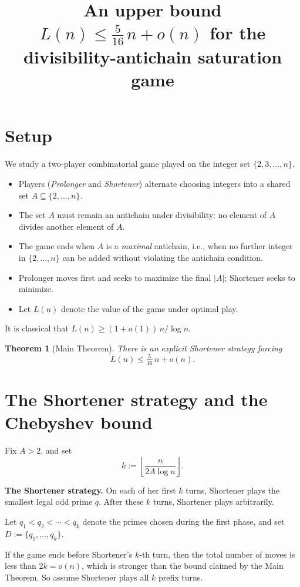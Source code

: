 \documentclass{article}
\title{An upper bound $L(n) \le \tfrac{5}{16}\,n + o(n)$ for the divisibility-antichain saturation game}
\newtheorem{theorem}{Theorem}
\begin{document}
\maketitle

\section{Setup}

We study a two-player combinatorial game played on the integer set $\{2, 3, \ldots, n\}$.

\begin{itemize}
  \item Players (\emph{Prolonger} and \emph{Shortener}) alternate choosing integers into a shared set $A \subseteq \{2, \ldots, n\}$.
  \item The set $A$ must remain an antichain under divisibility: no element of $A$ divides another element of $A$.
  \item The game ends when $A$ is a \emph{maximal} antichain, i.e., when no further integer in $\{2, \ldots, n\}$ can be added without violating the antichain condition.
  \item Prolonger moves first and seeks to maximize the final $|A|$; Shortener seeks to minimize.
  \item Let $L(n)$ denote the value of the game under optimal play.
\end{itemize}

It is classical that $L(n) \ge (1 + o(1))\,n/\log n$.

\begin{theorem}[Main Theorem]
There is an explicit Shortener strategy forcing
\[
L(n) \le \tfrac{5}{16}\,n + o(n).
\]
\end{theorem}

\section{The Shortener strategy and the Chebyshev bound}

Fix $A > 2$, and set
\[
k := \left\lfloor \frac{n}{2 A \log n} \right\rfloor.
\]

\textbf{The Shortener strategy.} On each of her first $k$ turns, Shortener plays the smallest legal odd prime $q$. After these $k$ turns, Shortener plays arbitrarily.

Let $q_1 < q_2 < \cdots < q_k$ denote the primes chosen during the first phase, and set $D := \{q_1, \ldots, q_k\}$.

If the game ends before Shortener's $k$-th turn, then the total number of moves is less than $2k = o(n)$, which is stronger than the bound claimed by the Main Theorem. So assume Shortener plays all $k$ prefix turns.
\end{document}
